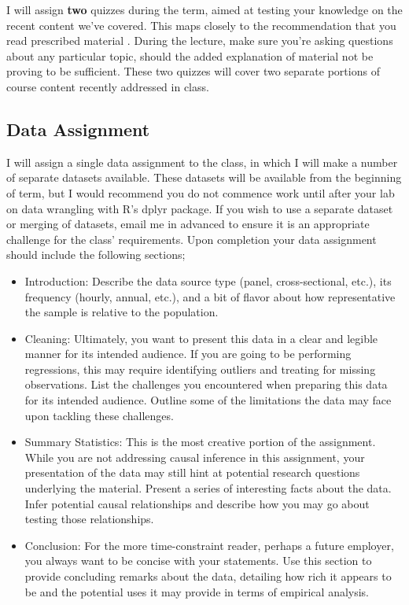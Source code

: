 \documentclass[10pt]{article}
\begin{document}
I will assign \textbf{two} quizzes during the term, aimed at testing your knowledge on the recent content we've covered.
This maps closely to the recommendation that you read prescribed material . 
During the lecture, make sure you're asking questions about any particular topic, should the added explanation of material not be proving to be sufficient. 
These two quizzes will cover two separate portions of course content recently addressed in class.

\subsection*{Data Assignment}

I will assign a single data assignment to the class, in which I will make a number of separate datasets available.
These datasets will be available from the beginning of term, but I would recommend you do not commence work until after your lab on data wrangling with R's dplyr package.
If you wish to use a separate dataset or merging of datasets, email me in advanced to ensure it is an appropriate challenge for the class' requirements.
Upon completion your data assignment should include the following sections;
\begin{itemize}
	\setlength{\itemsep}{0pt}
	\item Introduction: Describe the data source type (panel, cross-sectional, etc.), its frequency (hourly, annual, etc.), and a bit of flavor about how representative the sample is relative to the population.
	\item Cleaning: Ultimately, you want to present this data in a clear and legible manner for its intended audience. If you are going to be performing regressions, this may require identifying outliers and treating for missing observations. 
	List the challenges you encountered when preparing this data for its intended audience. Outline some of the limitations the data may face upon tackling these challenges. 
	\item Summary Statistics: This is the most creative portion of the assignment. While you are not addressing causal inference in this assignment, your presentation of the data may still hint at potential research questions underlying the material. 
	Present a series of interesting facts about the data. Infer potential causal relationships and describe how you may go about testing those relationships.
	\item Conclusion: For the more time-constraint reader, perhaps a future employer, you always want to be concise with your statements. Use this section to provide concluding remarks about the data, detailing how rich it appears to be and the potential uses it may provide in terms of empirical analysis.
\end{itemize}
\end{document}
